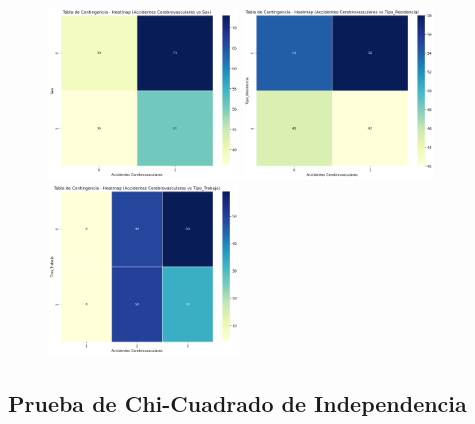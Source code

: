 \documentclass[a4paper, 12pt]{article}
\begin{document}
\begin{figure}[H]
    \includegraphics[width=0.45\textwidth]{img/Heatmap/Accidentes_Sex.png} \hspace{0.5cm}
    \includegraphics[width=0.45\textwidth]{img/Heatmap/Accidentes_Tipo_Residencia.png} \vspace{0.5cm}
    \vspace{0.3cm}
    \includegraphics[width=0.45\textwidth]{img/Heatmap/Accidentes_Tipo_Trabajo.png}
\end{figure}

\subsection{Prueba de Chi-Cuadrado de Independencia}
\end{document}
